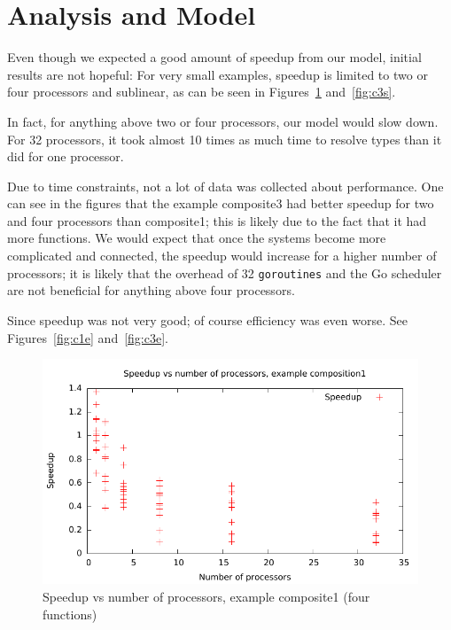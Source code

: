 \documentclass{acm_proc_article-sp}
\begin{document}
\section{Analysis and Model}

Even though we expected a good amount of speedup from our model, initial
results are not hopeful: For very small examples, speedup is limited to two or
four processors and sublinear, as can be seen in Figures~\ref{fig:c1s}
and~\ref{fig:c3s}. 

In fact, for anything above two or four processors, our model would slow down.
For 32 processors, it took almost 10 times as much time to resolve types than
it did for one processor.

Due to time constraints, not a lot of data was collected about performance. One
can see in the figures that the example composite3 had better speedup for two
and four processors than composite1; this is likely due to the fact that it had
more functions. We would expect that once the systems become more complicated
and connected, the speedup would increase for a higher number of processors; it
is likely that the overhead of 32 \texttt{goroutines} and the Go scheduler are
not beneficial for anything above four processors.

Since speedup was not very good; of course efficiency was even worse. See
Figures~\ref{fig:c1e} and~\ref{fig:c3e}.

\begin{figure}[ht] 
	\centering
	\includegraphics[scale=0.6]{../../data/composite1-speedup.pdf}
	\caption{Speedup vs number of processors, example composite1 (four
	functions)} 
	\label{fig:c1s} 
\end{figure} 
\end{document}
